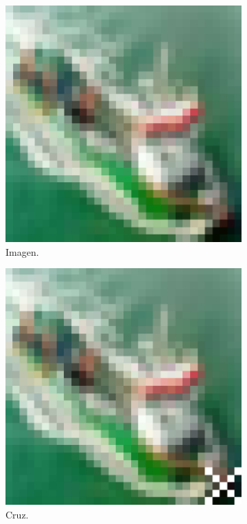 \begin{figure}[h!]
\begin{subfigure}{.16\linewidth}
  \includegraphics[width=0.8\linewidth]{figuras/backdoor/cifar.png}
  \caption{Imagen.}
\end{subfigure}
\begin{subfigure}{.16\linewidth}
  \centering
  \includegraphics[width=0.8\linewidth]{figuras/backdoor/cifar_cross.png}
  \caption{Cruz.}
\end{subfigure}
\begin{subfigure}{.16\linewidth}
  \centering

\end{subfigure}
\end{figure}
